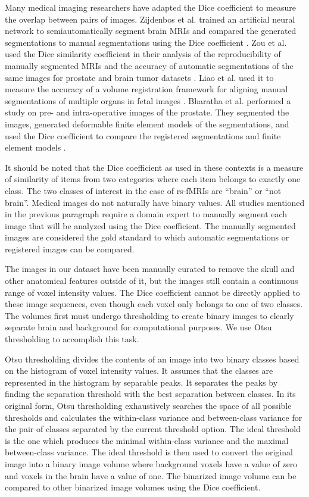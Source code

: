 Many medical imaging researchers have adapted the Dice coefficient to measure the overlap between pairs of images. %
Zijdenbos et al. trained an artificial neural network to semiautomatically segment brain MRIs and compared the generated segmentations to manual segmentations using the Dice coefficient \cite{Zijdenbos1994}.
Zou et al. used the Dice similarity coefficient in their analysis of the reproducibility of manually segmented MRIs and the accuracy of automatic segmentations of the same images for prostate and brain tumor datasets \cite{Zou2004}. 
Liao et al. used it to measure the accuracy of a volume registration framework for aligning manual segmentations of multiple organs in fetal images \cite{Liao2016}. Bharatha et al. performed a study on pre- and intra-operative images of the prostate. They segmented the images, generated deformable finite element models of the segmentations, and used the Dice coefficient to compare the registered segmentations and finite element models \cite{Bharatha2001}.

It should be noted that the Dice coefficient as used in these contexts is a measure of similarity of items from two categories where each item belongs to exactly one class. The two classes of interest in the case of rs-fMRIs are ``brain'' or ``not brain''. Medical images do not naturally have binary values. All studies mentioned in the previous paragraph require a domain expert to manually segment each image that will be analyzed using the Dice coefficient. The manually segmented images are considered the gold standard to which automatic segmentations or registered images can be compared. 

The images in our dataset have been manually curated to remove the skull and other anatomical features outside of it, but the images still contain a continuous range of voxel intensity values. The Dice coefficient cannot be directly applied to these image sequences, even though each voxel only belongs to one of two classes. The volumes first must undergo thresholding to create binary images to clearly separate brain and background for computational purposes. We use Otsu thresholding to accomplish this task. 

Otsu thresholding divides the contents of an image into two binary classes based on the histogram of voxel intensity values. It assumes that the classes are represented in the histogram by separable peaks. It separates the peaks by finding the separation threshold with the best separation between classes. In its original form, Otsu thresholding exhaustively searches the space of all possible thresholds and calculates the within-class variance and between-class variance for the pair of classes separated by the current threshold option. The ideal threshold is the one which produces the minimal within-class variance and the maximal between-class variance. The ideal threshold is then used to convert the original image into a binary image volume where background voxels have a value of zero and voxels in the brain have a value of one. The binarized image volume can be compared to other binarized image volumes using the Dice coefficient. 

